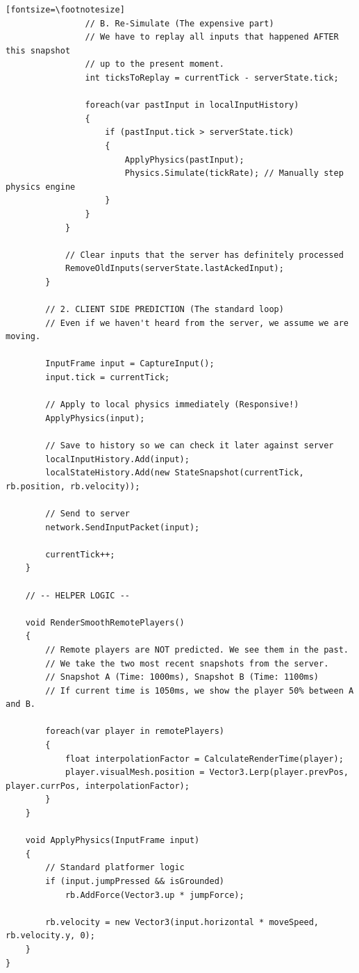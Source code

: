\documentclass{article}
\begin{document}
\begin{verbatim}[fontsize=\footnotesize]
                // B. Re-Simulate (The expensive part)
                // We have to replay all inputs that happened AFTER this snapshot
                // up to the present moment.
                int ticksToReplay = currentTick - serverState.tick;

                foreach(var pastInput in localInputHistory)
                {
                    if (pastInput.tick > serverState.tick)
                    {
                        ApplyPhysics(pastInput);
                        Physics.Simulate(tickRate); // Manually step physics engine
                    }
                }
            }

            // Clear inputs that the server has definitely processed
            RemoveOldInputs(serverState.lastAckedInput);
        }

        // 2. CLIENT SIDE PREDICTION (The standard loop)
        // Even if we haven't heard from the server, we assume we are moving.

        InputFrame input = CaptureInput();
        input.tick = currentTick;

        // Apply to local physics immediately (Responsive!)
        ApplyPhysics(input);

        // Save to history so we can check it later against server
        localInputHistory.Add(input);
        localStateHistory.Add(new StateSnapshot(currentTick, rb.position, rb.velocity));

        // Send to server
        network.SendInputPacket(input);

        currentTick++;
    }

    // -- HELPER LOGIC --

    void RenderSmoothRemotePlayers()
    {
        // Remote players are NOT predicted. We see them in the past.
        // We take the two most recent snapshots from the server.
        // Snapshot A (Time: 1000ms), Snapshot B (Time: 1100ms)
        // If current time is 1050ms, we show the player 50% between A and B.

        foreach(var player in remotePlayers)
        {
            float interpolationFactor = CalculateRenderTime(player);
            player.visualMesh.position = Vector3.Lerp(player.prevPos, player.currPos, interpolationFactor);
        }
    }

    void ApplyPhysics(InputFrame input)
    {
        // Standard platformer logic
        if (input.jumpPressed && isGrounded)
            rb.AddForce(Vector3.up * jumpForce);

        rb.velocity = new Vector3(input.horizontal * moveSpeed, rb.velocity.y, 0);
    }
}
\end{verbatim}
\end{document}
